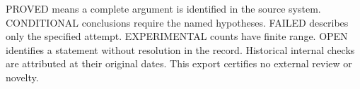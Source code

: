 \smallskip{} PROVED means a complete argument is identified in the source system. CONDITIONAL conclusions require the named hypotheses. FAILED describes only the specified attempt. EXPERIMENTAL counts have finite range. OPEN identifies a statement without resolution in the record. Historical internal checks are attributed at their original dates. This export certifies no external review or novelty.

\renewcommand{\refname}{Selected native reports}
\begingroup\small\setlength{\parskip}{0pt}\endgroup
